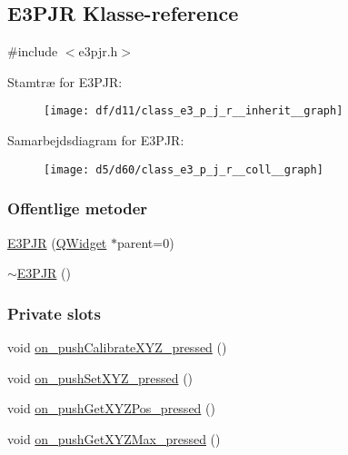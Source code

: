 \hypertarget{class_e3_p_j_r}{}\subsection{E3\+P\+JR Klasse-\/reference}
\label{class_e3_p_j_r}


{\ttfamily \#include $<$e3pjr.\+h$>$}



Stamtræ for E3\+P\+JR\+:\nopagebreak
\begin{figure}[H]
\begin{center}
\leavevmode
\texttt{[image: df/d11/class\_e3\_p\_j\_r\_\_inherit\_\_graph]}
\end{center}
\end{figure}


Samarbejdsdiagram for E3\+P\+JR\+:\nopagebreak
\begin{figure}[H]
\begin{center}
\leavevmode
\texttt{[image: d5/d60/class\_e3\_p\_j\_r\_\_coll\_\_graph]}
\end{center}
\end{figure}
\subsubsection*{Offentlige metoder}
\begin{DoxyCompactItemize}
\item 
\hyperlink{class_e3_p_j_r_a3a52bafbf77585b77f7cdfd3d5a2ab56}{E3\+P\+JR} (\hyperlink{class_q_widget}{Q\+Widget} $\ast$parent=0)
\item 
\hyperlink{class_e3_p_j_r_aeb532350a6ae56c292c37a6b983dffa2}{$\sim$\+E3\+P\+JR} ()
\end{DoxyCompactItemize}
\subsubsection*{Private slots}
\begin{DoxyCompactItemize}
\item 
void \hyperlink{class_e3_p_j_r_a6be58dfeec35962cafa418d47ebffc72}{on\+\_\+push\+Calibrate\+X\+Y\+Z\+\_\+pressed} ()
\item 
void \hyperlink{class_e3_p_j_r_af5298acfab7b21baee2e8eb8dd495ddb}{on\+\_\+push\+Set\+X\+Y\+Z\+\_\+pressed} ()
\item 
void \hyperlink{class_e3_p_j_r_a1384ab1d803de29103a58660ec602240}{on\+\_\+push\+Get\+X\+Y\+Z\+Pos\+\_\+pressed} ()
\item 
void \hyperlink{class_e3_p_j_r_a0230271a4b635131924f64f1fa354345}{on\+\_\+push\+Get\+X\+Y\+Z\+Max\+\_\+pressed} ()
\end{DoxyCompactItemize}
